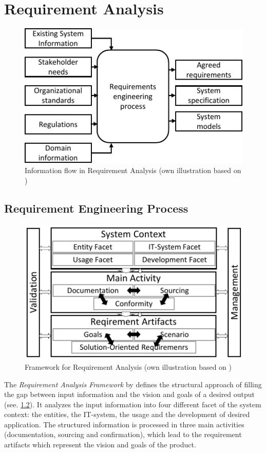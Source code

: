 \chapter{Requirement Analysis}
\begin{figure}[H]
    \centering
    \includegraphics[scale=1.3]{img/RequirementInformationStream.pdf}
    \caption{Information flow in Requirement Analysis (own illustration based on \protect\cite[28]{Kotonya.2000})}
    \label{fig:reqFramework}
\end{figure}
\section{Requirement Engineering Process}
\begin{figure}[H]
    \centering
    \includegraphics[scale=1.5]{img/ReqAnFrameWork.pdf}
    \caption{Framework for Requirement Analysis (own illustration based on \protect\cite[41]{Pohl.2007})}
    \label{fig:reqFramework}
\end{figure}
The \textit{Requirement Analysis Framework} by \textcite{Pohl.2007} defines the structural approach of filling the gap between input information and the vision and goals of a desired output (see. \ref{fig:reqFramework}). It analyzes the input information into four different facet of the system context: the entities, the IT-system, the usage and the development of desired application. The structured information is processed in three main activities (documentation, sourcing and confirmation), which lead to the requirement artifacts which represent the vision and goals of the product. \parencite[][38-39]{Pohl.2007}
